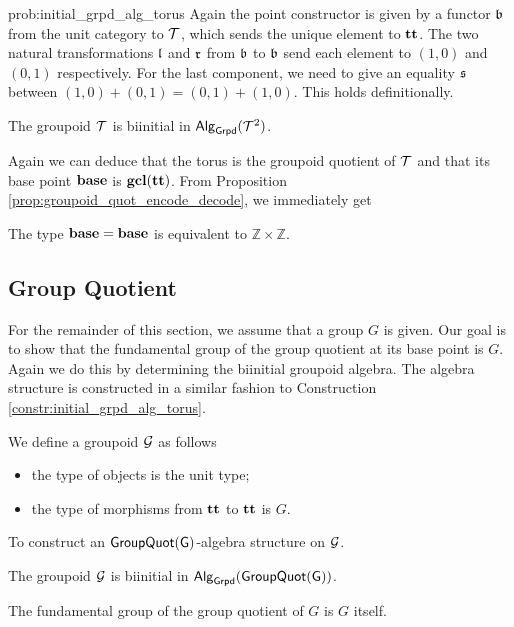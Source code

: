 \begin{construction}{prob:initial_grpd_alg_torus}
\label{constr:initial_grpd_alg_torus}
Again the point constructor is given by a functor $\mathfrak{b}$ from the unit category to $\mathcal{T}$, which sends the unique element to $\operatorname{\mathbf{tt}}$.
The two natural transformations $\mathfrak{l}$ and $\mathfrak{r}$ from $\mathfrak{b}$ to $\mathfrak{b}$ send each element to $(1, 0)$ and $(0, 1)$ respectively.
For the last component, we need to give an equality $\mathfrak{s}$ between $(1, 0) + (0, 1) = (0, 1) + (1, 0)$.
This holds definitionally.
\end{construction}

\begin{proposition}
The groupoid $\mathcal{T}$ is biinitial in $\mathsf{Alg}_{\mathsf{Grpd}}(\mathcal{T}^2)$.
\end{proposition}

Again we can deduce that the torus is the groupoid quotient of $\mathcal{T}$ and that its base point $\operatorname{\mathbf{base}}$ is $\operatorname{\mathbf{gcl}}(\operatorname{\mathbf{tt}})$.
From Proposition \ref{prop:groupoid_quot_encode_decode}, we immediately get

\begin{corollary}
The type $\operatorname{\mathbf{base}} = \operatorname{\mathbf{base}}$ is equivalent to $\mathbb{Z} \times \mathbb{Z}$.
\end{corollary}

\subsection{Group Quotient}
\label{sec:group_quotient_fund_group}
For the remainder of this section, we assume that a group $G$ is given.
Our goal is to show that the fundamental group of the group quotient at its base point is $G$.
Again we do this by determining the biinitial groupoid algebra.
The algebra structure is constructed in a similar fashion to Construction \ref{constr:initial_grpd_alg_torus}.

\begin{definition}
We define a groupoid $\mathcal{G}$ as follows
\begin{itemize}
	\item the type of objects is the unit type;
	\item the type of morphisms from $\operatorname{\mathbf{tt}}$ to $\operatorname{\mathbf{tt}}$ is $G$.
\end{itemize}
\end{definition}

\begin{problem}
\label{prob:initial_grpd_alg_group_quot}
To construct an $\mathsf{GroupQuot(G)}$-algebra structure on $\mathcal{G}$.
\end{problem}

\begin{proposition}
The groupoid $\mathcal{G}$ is biinitial in $\mathsf{Alg}_{\mathsf{Grpd}}(\mathsf{GroupQuot(G)})$.
\end{proposition}

\begin{corollary}
The fundamental group of the group quotient of $G$ is $G$ itself.
\end{corollary}
